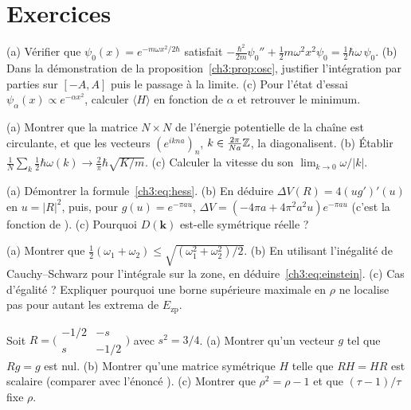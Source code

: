\section{Exercices}\label{ch3:sec:exercices}

\begin{exercise}[Oscillateur]\label{ch3:ex:osc}
(a) Vérifier que $\psi_0(x)=e^{-m\omega x^2/2\hbar}$ satisfait $-\tfrac{\hbar^2}{2m}\psi_0''+\tfrac12m\omega^2x^2\psi_0=\tfrac12\hbar\omega\,\psi_0$.
(b) Dans la démonstration de la proposition~\ref{ch3:prop:osc}, justifier l'intégration par parties sur $[-A,A]$ puis le
passage à la limite. (c) Pour l'état d'essai $\psi_\alpha(x)\propto e^{-\alpha x^2}$, calculer $\langle H\rangle$ en
fonction de $\alpha$ et retrouver le minimum.
\end{exercise}

\begin{exercise}\label{ch3:ex:chaine}
(a) Montrer que la matrice $N\times N$ de l'énergie potentielle de la chaîne est circulante, et que les vecteurs
$(e^{ikna})_n$, $k\in\tfrac{2\pi}{Na}\mathbb{Z}$, la diagonalisent. (b) Établir
$\frac1N\sum_k\tfrac12\hbar\omega(k)\to\tfrac2\pi\hbar\sqrt{K/m}$. (c) Calculer la vitesse du son $\lim_{k\to0}\omega/|k|$.
\end{exercise}

\begin{exercise}\label{ch3:ex:hess}
(a) Démontrer la formule~\eqref{ch3:eq:hess}. (b) En déduire $\Delta V(R)=4(ug')'(u)$ en $u=|R|^2$, puis, pour
$g(u)=e^{-\pi au}$, $\Delta V=(-4\pi a+4\pi^2a^2u)e^{-\pi au}$ (c'est la fonction  de
). (c) Pourquoi $D(\mathbf k)$ est-elle symétrique réelle ?
\end{exercise}

\begin{exercise}\label{ch3:ex:einstein}
(a) Montrer que $\tfrac12(\omega_1+\omega_2)\le\sqrt{(\omega_1^2+\omega_2^2)/2}$. (b) En utilisant l'inégalité de
Cauchy--Schwarz pour l'intégrale sur la zone, en déduire~\eqref{ch3:eq:einstein}. (c) Cas d'égalité ? Expliquer pourquoi
une borne supérieure maximale en $\rho$ ne localise pas pour autant les extrema de $E_{\mathrm{zp}}$.
\end{exercise}

\begin{exercise}\label{ch3:ex:rot}
Soit $R=\bigl(\begin{smallmatrix}-1/2&-s\\s&-1/2\end{smallmatrix}\bigr)$ avec $s^2=3/4$. (a) Montrer qu'un vecteur
$g$ tel que $Rg=g$ est nul. (b) Montrer qu'une matrice symétrique $H$ telle que $RH=HR$ est scalaire (comparer avec
l'énoncé ). (c) Montrer que $\rho^2=\rho-1$ et que $(\tau-1)/\tau$ fixe $\rho$.
\end{exercise}

